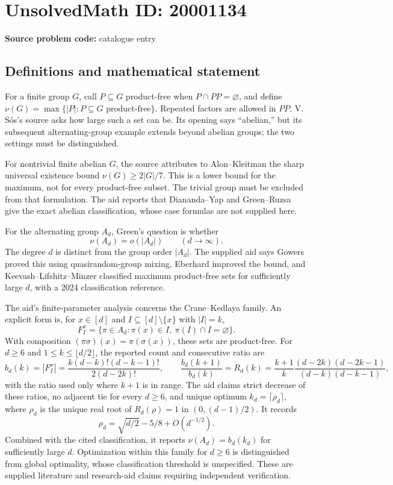 \documentclass[11pt]{article}
\begin{document}
\section*{UnsolvedMath ID: 20001134}
\textbf{Source problem code:} catalogue entry
\subsection{Definitions and mathematical statement}
For a finite group $G$, call $P\subseteq G$ product-free when $P\cap PP=\varnothing$, and define $\nu(G)=\max\{|P|:P\subseteq G\text{ product-free}\}$. Repeated factors are allowed in $PP$. V. S\'os's source asks how large such a set can be. Its opening says ``abelian,'' but its subsequent alternating-group example extends beyond abelian groups; the two settings must be distinguished.

For nontrivial finite abelian $G$, the source attributes to Alon--Kleitman the sharp universal existence bound $\nu(G)\geq2|G|/7$. This is a lower bound for the maximum, not for every product-free subset. The trivial group must be excluded from that formulation. The aid reports that Diananda--Yap and Green--Ruzsa give the exact abelian classification, whose case formulas are not supplied here.

For the alternating group $A_d$, Green's question is whether
\[
 \nu(A_d)=o(|A_d|)\qquad(d\to\infty).
\]
The degree $d$ is distinct from the group order $|A_d|$. The supplied aid says Gowers proved this using quasirandom-group mixing, Eberhard improved the bound, and Keevash--Lifshitz--Minzer classified maximum product-free sets for sufficiently large $d$, with a 2024 classification reference.

The aid's finite-parameter analysis concerns the Crane--Kedlaya family. An explicit form is, for $x\in[d]$ and $I\subseteq[d]\setminus\{x\}$ with $|I|=k$,
\[
 F_I^x=\{\pi\in A_d:\pi(x)\in I,\ \pi(I)\cap I=\varnothing\}.
\]
With composition $(\pi\sigma)(x)=\pi(\sigma(x))$, these sets are product-free. For $d\geq6$ and $1\leq k\leq\lfloor d/2\rfloor$, the reported count and consecutive ratio are
\[
 b_d(k)=|F_I^x|=\frac{k(d-k)!(d-k-1)!}{2(d-2k)!},\qquad
 \frac{b_d(k+1)}{b_d(k)}
 =R_d(k)=\frac{k+1}{k}\frac{(d-2k)(d-2k-1)}{(d-k)(d-k-1)},
\]
with the ratio used only where $k+1$ is in range. The aid claims strict decrease of these ratios, no adjacent tie for every $d\geq6$, and unique optimum $k_d=\lceil\rho_d\rceil$, where $\rho_d$ is the unique real root of $R_d(\rho)=1$ in $(0,(d-1)/2)$. It records
\[
 \rho_d=\sqrt{d/2}-5/8+O(d^{-1/2}).
\]
Combined with the cited classification, it reports $\nu(A_d)=b_d(k_d)$ for sufficiently large $d$. Optimization within this family for $d\geq6$ is distinguished from global optimality, whose classification threshold is unspecified. These are supplied literature and research-aid claims requiring independent verification.
\end{document}
